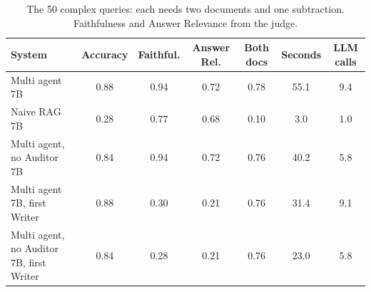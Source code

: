\begin{table}[!tb]
\centering
\caption{The 50 complex queries: each needs two documents and one subtraction. Faithfulness and Answer Relevance from the judge.}
\label{tab:multihop}
\footnotesize
\setlength{\tabcolsep}{3.5pt}
\begin{tabular}{lcccccc}
\toprule
System & Accuracy & Faithful. & Answer Rel. & Both docs & Seconds & LLM calls \\
\midrule
Multi agent 7B & 0.88 & 0.94 & 0.72 & 0.78 & 55.1 & 9.4 \\
Naive RAG 7B & 0.28 & 0.77 & 0.68 & 0.10 & 3.0 & 1.0 \\
Multi agent, no Auditor 7B & 0.84 & 0.94 & 0.72 & 0.76 & 40.2 & 5.8 \\
Multi agent 7B, first Writer & 0.88 & 0.30 & 0.21 & 0.76 & 31.4 & 9.1 \\
Multi agent, no Auditor 7B, first Writer & 0.84 & 0.28 & 0.21 & 0.76 & 23.0 & 5.8 \\
\bottomrule
\end{tabular}
\end{table}
